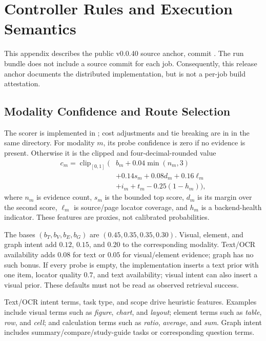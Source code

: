 \section{Controller Rules and Execution Semantics}
\label{app:rules}
This appendix describes the public v0.0.40 source anchor, commit
.
The run bundle does not include a source commit for each job. Consequently, this release anchor documents the distributed implementation, but is not a per-job build attestation.

\subsection{Modality Confidence and Route Selection}
The scorer is implemented in ; cost adjustments and tie breaking are in  in the same directory. For modality $m$, its probe confidence is zero if no evidence is present. Otherwise it is the clipped and four-decimal-rounded value
\begin{align}
 c_m=\operatorname{clip}_{[0,1]}\big(&b_m+0.04\min(n_m,3)\nonumber\\
 &+0.14s_m+0.08d_m+0.16\ell_m\nonumber\\
 &+i_m+t_m-0.25(1-h_m)\big),
\end{align}
where $n_m$ is evidence count, $s_m$ is the bounded top score, $d_m$ is its margin over the second score, $\ell_m$ is source/page locator coverage, and $h_m$ is a backend-health indicator. These features are proxies, not calibrated probabilities.

The bases $(b_T,b_V,b_E,b_G)$ are $(0.45,0.35,0.35,0.30)$. Visual, element, and graph intent add $0.12$, $0.15$, and $0.20$ to the corresponding modality. Text/OCR availability adds $0.08$ for text or $0.05$ for visual/element evidence; graph has no such bonus. If every probe is empty, the implementation inserts a text prior with one item, locator quality $0.7$, and text availability; visual intent can also insert a visual prior. These defaults must not be read as observed retrieval success.

Text/OCR intent terms, task type, and scope drive heuristic features. Examples include visual terms such as \emph{figure}, \emph{chart}, and \emph{layout}; element terms such as \emph{table}, \emph{row}, and \emph{cell}; and calculation terms such as \emph{ratio}, \emph{average}, and \emph{sum}. Graph intent includes summary/compare/study-guide tasks or corresponding question terms.

